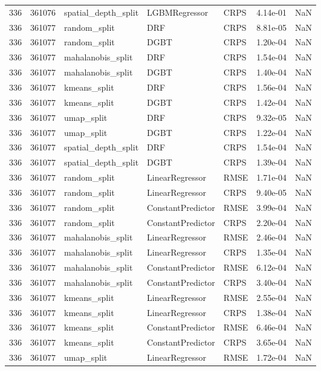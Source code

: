 \begin{tabular}{rrlllrr}
336 & 361076 & spatial\_depth\_split & LGBMRegressor & CRPS & 4.14e-01 & NaN \\
336 & 361077 & random\_split & DRF & CRPS & 8.81e-05 & NaN \\
336 & 361077 & random\_split & DGBT & CRPS & 1.20e-04 & NaN \\
336 & 361077 & mahalanobis\_split & DRF & CRPS & 1.54e-04 & NaN \\
336 & 361077 & mahalanobis\_split & DGBT & CRPS & 1.40e-04 & NaN \\
336 & 361077 & kmeans\_split & DRF & CRPS & 1.56e-04 & NaN \\
336 & 361077 & kmeans\_split & DGBT & CRPS & 1.42e-04 & NaN \\
336 & 361077 & umap\_split & DRF & CRPS & 9.32e-05 & NaN \\
336 & 361077 & umap\_split & DGBT & CRPS & 1.22e-04 & NaN \\
336 & 361077 & spatial\_depth\_split & DRF & CRPS & 1.54e-04 & NaN \\
336 & 361077 & spatial\_depth\_split & DGBT & CRPS & 1.39e-04 & NaN \\
336 & 361077 & random\_split & LinearRegressor & RMSE & 1.71e-04 & NaN \\
336 & 361077 & random\_split & LinearRegressor & CRPS & 9.40e-05 & NaN \\
336 & 361077 & random\_split & ConstantPredictor & RMSE & 3.99e-04 & NaN \\
336 & 361077 & random\_split & ConstantPredictor & CRPS & 2.20e-04 & NaN \\
336 & 361077 & mahalanobis\_split & LinearRegressor & RMSE & 2.46e-04 & NaN \\
336 & 361077 & mahalanobis\_split & LinearRegressor & CRPS & 1.35e-04 & NaN \\
336 & 361077 & mahalanobis\_split & ConstantPredictor & RMSE & 6.12e-04 & NaN \\
336 & 361077 & mahalanobis\_split & ConstantPredictor & CRPS & 3.40e-04 & NaN \\
336 & 361077 & kmeans\_split & LinearRegressor & RMSE & 2.55e-04 & NaN \\
336 & 361077 & kmeans\_split & LinearRegressor & CRPS & 1.38e-04 & NaN \\
336 & 361077 & kmeans\_split & ConstantPredictor & RMSE & 6.46e-04 & NaN \\
336 & 361077 & kmeans\_split & ConstantPredictor & CRPS & 3.65e-04 & NaN \\
336 & 361077 & umap\_split & LinearRegressor & RMSE & 1.72e-04 & NaN \\

\end{tabular}
